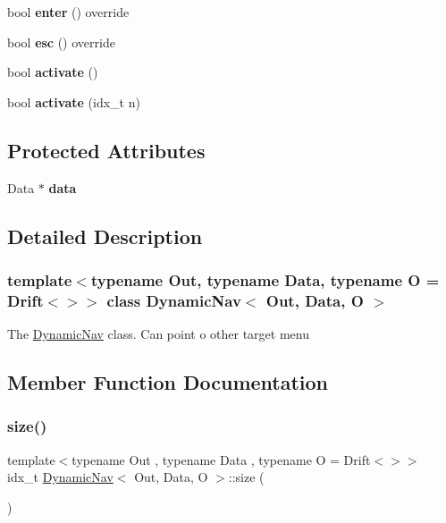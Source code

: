 \begin{DoxyCompactItemize}
\mbox{\label{classDynamicNav_a59065bd180e14a92379566fdcad35ab1}} 
bool {\bfseries enter} () override
\item 
\mbox{\label{classDynamicNav_a1f61734c8aa2f8adec54212f83a6b7a1}} 
bool {\bfseries esc} () override
\item 
\mbox{\label{classDynamicNav_a77e8078828630a6ef946e472ebeb4130}} 
bool {\bfseries activate} ()
\item 
\mbox{\label{classDynamicNav_a70393001852492fd26b28ab9bd336175}} 
bool {\bfseries activate} (idx\+\_\+t n)
\end{DoxyCompactItemize}
\subsection*{Protected Attributes}
\begin{DoxyCompactItemize}
\item 
\mbox{\label{classDynamicNav_a51aa4aa344f698a9995e184b179cb767}} 
Data $\ast$ {\bfseries data}
\end{DoxyCompactItemize}


\subsection{Detailed Description}
\subsubsection*{template$<$typename Out, typename Data, typename O = Drift$<$$>$$>$\newline
class Dynamic\+Nav$<$ Out, Data, O $>$}

The \hyperlink{classDynamicNav}{Dynamic\+Nav} class. Can point o other target menu 

\subsection{Member Function Documentation}
\mbox{\label{classDynamicNav_a889041fa079206abea35978d17267fa0}} 
\subsubsection{\texorpdfstring{size()}{size()}}
{\footnotesize\ttfamily template$<$typename Out , typename Data , typename O  = Drift$<$$>$$>$ \\
idx\+\_\+t \hyperlink{classDynamicNav}{Dynamic\+Nav}$<$ Out, Data, O $>$\+::size (\begin{DoxyParamCaption}{ }\end{DoxyParamCaption})\hspace{0.3cm}{\ttfamily [inline]}}



